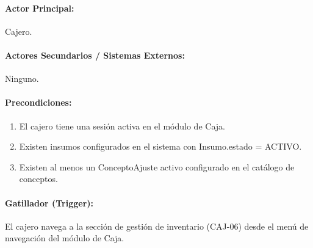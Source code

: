 \paragraph{Actor Principal:} Cajero.

\paragraph{Actores Secundarios / Sistemas Externos:} Ninguno.

\paragraph{Precondiciones:}
\begin{enumerate}
    \item[I.] El cajero tiene una sesión activa en el módulo de Caja.
    \item[II.] Existen insumos configurados en el sistema con Insumo.estado = ACTIVO.
    \item[III.] Existen al menos un ConceptoAjuste activo configurado en el catálogo de conceptos.
\end{enumerate}

\paragraph{Gatillador (Trigger):} El cajero navega a la sección de gestión de inventario (CAJ-06) desde el menú de navegación del módulo de Caja.

